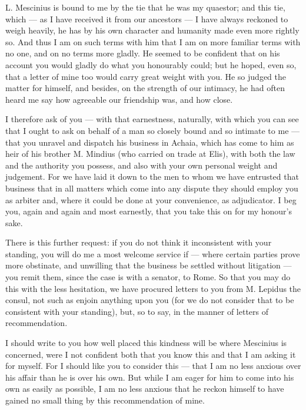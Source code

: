 

 L. Mescinius is bound to me by the tie that he was my quaestor; and this tie, which --- as I have received it from our ancestors --- I have always reckoned to weigh heavily, he has by his own character and humanity made even more rightly so. And thus I am on such terms with him that I am on more familiar terms with no one, and on no terms more gladly. He seemed to be confident that on his account you would gladly do what you honourably could; but he hoped, even so, that a letter of mine too would carry great weight with you. He so judged the matter for himself, and besides, on the strength of our intimacy, he had often heard me say how agreeable our friendship was, and how close.

 I therefore ask of you --- with that earnestness, naturally, with which you can see that I ought to ask on behalf of a man so closely bound and so intimate to me --- that you unravel and dispatch his business in Achaia, which has come to him as heir of his brother M. Mindius (who carried on trade at Elis), with both the law and the authority you possess, and also with your own personal weight and judgement. For we have laid it down to the men to whom we have entrusted that business that in all matters which come into any dispute they should employ you as arbiter and, where it could be done at your convenience, as adjudicator. I beg you, again and again and most earnestly, that you take this on for my honour's sake.

 There is this further request: if you do not think it inconsistent with your standing, you will do me a most welcome service if --- where certain parties prove more obstinate, and unwilling that the business be settled without litigation --- you remit them, since the case is with a senator, to Rome. So that you may do this with the less hesitation, we have procured letters to you from M. Lepidus the consul, not such as enjoin anything upon you (for we do not consider that to be consistent with your standing), but, so to say, in the manner of letters of recommendation.

 I should write to you how well placed this kindness will be where Mescinius is concerned, were I not confident both that you know this and that I am asking it for myself. For I should like you to consider this --- that I am no less anxious over his affair than he is over his own. But while I am eager for him to come into his own as easily as possible, I am no less anxious that he reckon himself to have gained no small thing by this recommendation of mine.
